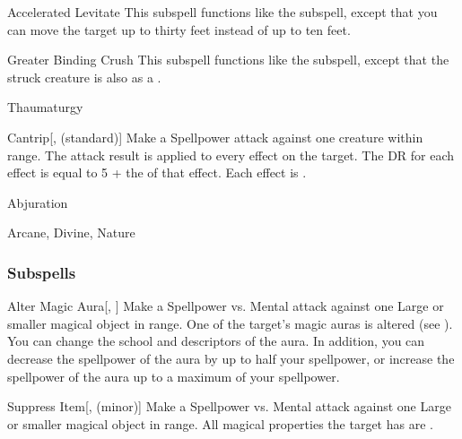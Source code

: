 \begin{ability}[\nth{5}]{Accelerated Levitate}
This subspell functions like the  subspell, except that you can move the target up to thirty feet instead of up to ten feet.
\end{ability}
\vspace{0.25em}


\begin{ability}[\nth{6}]{Greater Binding Crush}
This subspell functions like the  subspell, except that the struck creature is also  as a .
\end{ability}
\vspace{0.25em}

\newpage
\begin{spellsection}{Thaumaturgy}


\begin{ability}{Cantrip}[,  (standard)]
Make a Spellpower attack against one creature within \rngmed range.
The attack result is applied to every  effect on the target.
The DR for each effect is equal to 5 + the  of that effect.
\hit Each effect is .
\end{ability}




 Abjuration

 Arcane, Divine, Nature
\end{spellsection}


\subsubsection{Subspells}


\begin{ability}[\nth{1}]{Alter Magic Aura}[, ]
Make a Spellpower vs. Mental attack against one Large or smaller magical object in \rngmed range.
\hit One of the target's magic auras is altered (see ).
You can change the school and descriptors of the aura.
In addition, you can decrease the spellpower of the aura by up to half your spellpower, or increase the spellpower of the aura up to a maximum of your spellpower.
\end{ability}
\vspace{0.25em}


\begin{ability}[\nth{1}]{Suppress Item}[,  (minor)]
Make a Spellpower vs. Mental attack against one Large or smaller magical object in \rngmed range.
\hit All magical properties the target has are .
\end{ability}
\vspace{0.25em}


